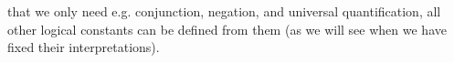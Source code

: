 \documentclass[notes,mh]{mikoslides}
\begin{document}
\begin{module}[id=pl1-syntax]
\begin{nomtext}[title=Note]
  that we only need e.g. conjunction, negation, and universal quantification, all other
  logical constants can be defined from them (as we will see when we have fixed their
  interpretations).
\end{nomtext}
\end{module}
\end{document}
